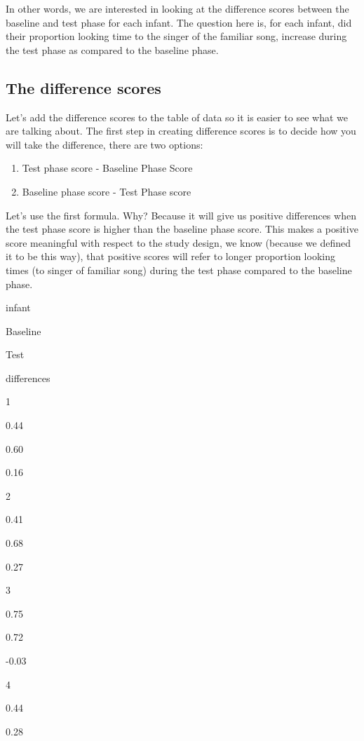 \documentclass[
]{book}
\providecommand{\tightlist}{%
  \setlength{\itemsep}{0pt}\setlength{\parskip}{0pt}}
\begin{document}
In other words, we are interested in looking at the difference scores between the baseline and test phase for each infant. The question here is, for each infant, did their proportion looking time to the singer of the familiar song, increase during the test phase as compared to the baseline phase.

\hypertarget{the-difference-scores}{%
\subsection{The difference scores}\label{the-difference-scores}}

Let's add the difference scores to the table of data so it is easier to see what we are talking about. The first step in creating difference scores is to decide how you will take the difference, there are two options:

\begin{enumerate}
\def\labelenumi{\arabic{enumi}.}
\tightlist
\item
  Test phase score - Baseline Phase Score
\item
  Baseline phase score - Test Phase score
\end{enumerate}

Let's use the first formula. Why? Because it will give us positive differences when the test phase score is higher than the baseline phase score. This makes a positive score meaningful with respect to the study design, we know (because we defined it to be this way), that positive scores will refer to longer proportion looking times (to singer of familiar song) during the test phase compared to the baseline phase.

infant

Baseline

Test

differences

1

0.44

0.60

0.16

2

0.41

0.68

0.27

3

0.75

0.72

-0.03

4

0.44

0.28
\end{document}
